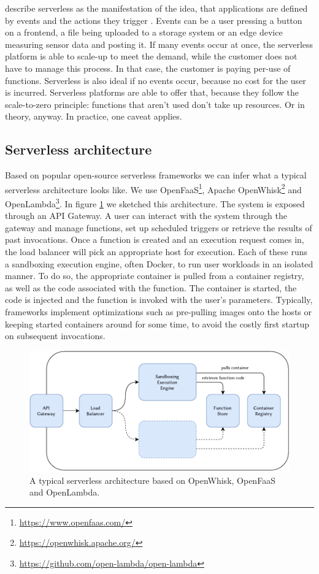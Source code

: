 \citeauthor{McGrath2017} describe serverless as the manifestation of the idea, that applications are defined by events and the actions they trigger \cite{McGrath2017}. Events can be a user pressing a button on a frontend, a file being uploaded to a storage system or an edge device measuring sensor data and posting it. If many events occur at once, the serverless platform is able to scale-up to meet the demand, while the customer does not have to manage this process. In that case, the customer is paying per-use of functions. Serverless is also ideal if no events occur, because no cost for the user is incurred. Serverless platforms are able to offer that, because they follow the scale-to-zero principle: functions that aren't used don't take up resources. Or in theory, anyway. In practice, one caveat applies.

\subsection{Serverless architecture}

Based on popular open-source serverless frameworks we can infer what a typical serverless architecture looks like. We use OpenFaaS\footnote{\url{https://www.openfaas.com/}}, Apache OpenWhisk\footnote{\url{https://openwhisk.apache.org/}} and OpenLambda\footnote{\url{https://github.com/open-lambda/open-lambda}}. In figure \ref{fig:serverless-architecture} we sketched this architecture. The system is exposed through an API Gateway. A user can interact with the system through the gateway and manage functions, set up scheduled triggers or retrieve the results of past invocations. Once a function is created and an execution request comes in, the load balancer will pick an appropriate host for execution. Each of these runs a sandboxing execution engine, often Docker, to run user workloads in an isolated manner. To do so, the appropriate container is pulled from a container registry, as well as the code associated with the function. The container is started, the code is injected and the function is invoked with the user's parameters. Typically, frameworks implement optimizations such as pre-pulling images onto the hosts or keeping started containers around for some time, to avoid the costly first startup on subsequent invocations.

\begin{figure}
    \includegraphics{figures/ServerlessArchitecture.pdf}
    \caption{A typical serverless architecture based on OpenWhisk, OpenFaaS and OpenLambda.}
    \label{fig:serverless-architecture}
\end{figure}



